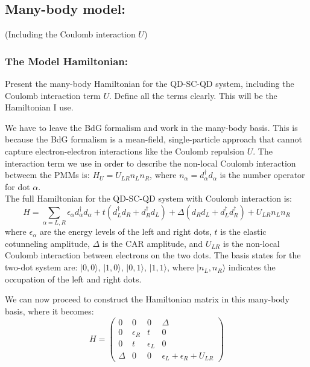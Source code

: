 \documentclass[11pt, letterpaper, titlepage]{article}
\begin{document}
\subsection{Many-body model:} (Including the Coulomb interaction $U$)
\subsubsection{The Model Hamiltonian:} Present the many-body Hamiltonian for the QD-SC-QD system, including the Coulomb interaction term $U$. Define all the terms clearly. This will be the Hamiltonian I use.\par
We have to leave the BdG formalism and work in the many-body basis. This is because the BdG formalism is a mean-field, single-particle approach that cannot capture electron-electron interactions like the Coulomb repulsion $U$. The interaction term we use in order to describe the non-local Coulomb interaction betweem the PMMs is: $H_U=U_{LR}n_Ln_R$, where $n_{α}=d_{α}^{†}d_{α}$ is the number operator for dot $α$.\\
The full Hamiltonian for the QD-SC-QD system with Coulomb interaction is:
$$
H = ∑_{α=L,R} ϵ_{α} d_{α}^{†}d_{α} + t (d_L^{†} d_R + d_R^{†} d_L) + Δ (d_R d_L + d_L^{†} d_R^{†})  + U_{LR} n_L n_R
$$
where $ϵ_{α}$ are the energy levels of the left and right dots, $t$ is the elastic cotunneling amplitude, $Δ$ is the CAR amplitude, and $U_{LR}$ is the non-local Coulomb interaction between electrons on the two dots. The basis states for the two-dot system are: $|0,0⟩$, $|1,0⟩$, $|0,1⟩$, $|1,1⟩$, where $|n_L,n_R⟩$ indicates the occupation of the left and right dots.\par
We can now proceed to construct the Hamiltonian matrix in this many-body basis, where it becomes:
$$
H = \begin{pmatrix}
0 & 0 & 0 & Δ \\
0 & ϵ_R & t & 0 \\
0 & t & ϵ_L & 0 \\
Δ & 0 & 0 & ϵ_L + ϵ_R + U_{LR}
\end{pmatrix}
$$
\end{document}
